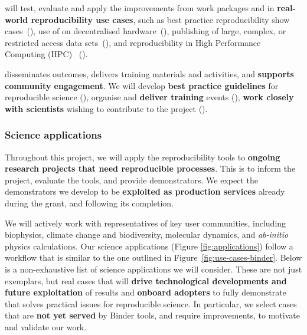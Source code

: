  will test, evaluate and apply the improvements from
work packages  and  in \textbf{real-world
reproducibility use cases}, such as best practice reproducibility show
cases~(), use of \repotodocker{} on
decentralised hardware~(), publishing
of large, complex, or restricted access data
sets~(), and reproducibility in High Performance Computing (HPC)~
().

 disseminates outcomes, delivers training materials
and activities, and \textbf{supports community engagement}. We will develop \textbf{best practice guidelines} for reproducible
science (), organise and \textbf{deliver
training} events (), \textbf{work closely with
scientists} wishing to contribute to the project ().

\subsubsection{Science applications}\label{sec:science-applications}

Throughout this project, we will apply the reproducibility tools to \textbf{ongoing
research projects that need reproducible processes}. This is to inform the
project, evaluate the tools, and provide demonstrators. We expect the
demonstrators we develop to be \textbf{exploited as production services} already during
the grant, and following its completion.

We will actively work with representatives of key user communities, including biophysics,
climate change and biodiversity, molecular dynamics, and \emph{ab-initio} physics calculations.
Our science applications (Figure \ref{fig:applications}) follow a workflow that is similar to the one
outlined in Figure~\ref{fig:use-cases-binder}.
Below is a non-exhaustive list of science applications we will consider. These are not just exemplars, but
real cases that will \textbf{drive technological developments and future exploitation} of \TheProject results
 and \textbf{onboard adopters} to fully demonstrate that \TheProject
solves practical issues for reproducible science.
In particular, we select cases that are \textbf{not yet served} by Binder tools,
and require improvements,
to motivate and validate our work.

